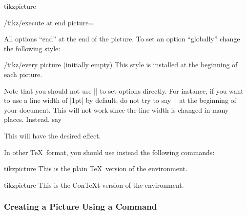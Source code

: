 \begin{environment}{{tikzpicture}}
\begin{key}{/tikz/execute at end picture=}
\begin{codeexample}[]
\end{codeexample}
  \end{key}

  All options ``end'' at the end of the picture. To set an option
  ``globally'' change the following style:
  \begin{key}{/tikz/every picture (initially \normalfont empty)}
    This style is installed at the beginning of each picture.
\begin{codeexample}
\tikzset{every picture/.style=semithick}
\end{codeexample}
  \end{key}

  Note that you should not use |\tikzset| to set options directly. For
  instance, if you want to use a line width of |1pt| by default, do
  not try to say |\tikzset{line width=1pt}| at the beginning of your
  document. This will not work since the line width is changed in many
  places. Instead, say
\begin{codeexample}
\end{codeexample}
  This will have the desired effect.
\end{environment}

In other \TeX\ format, you should use instead the following commands:

\begin{plainenvironment}{{tikzpicture}}
  This is the plain \TeX\ version of the environment.
\end{plainenvironment}

\begin{contextenvironment}{{tikzpicture}}
  This is the Con\TeX t version of the environment.
\end{contextenvironment}


\subsubsection{Creating a Picture Using a Command}

